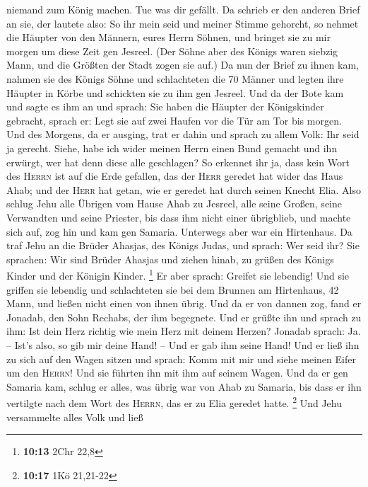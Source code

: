 niemand zum König machen. Tue was dir gefällt.  Da schrieb
er den anderen Brief an sie, der lautete also: So ihr mein seid und
meiner Stimme gehorcht, so nehmet die Häupter von den Männern, eures
Herrn Söhnen, und bringet sie zu mir morgen um diese Zeit gen Jesreel.
(Der Söhne aber des Königs waren siebzig Mann, und die Größten der Stadt
zogen sie auf.)  Da nun der Brief zu ihnen kam, nahmen sie
des Königs Söhne und schlachteten die 70 Männer und legten ihre Häupter
in Körbe und schickten sie zu ihm gen Jesreel.  Und da der
Bote kam und sagte es ihm an und sprach: Sie haben die Häupter der
Königskinder gebracht, sprach er: Legt sie auf zwei Haufen vor die Tür
am Tor bis morgen.  Und des Morgens, da er ausging, trat
er dahin und sprach zu allem Volk: Ihr seid ja gerecht. Siehe, habe ich
wider meinen Herrn einen Bund gemacht und ihn erwürgt, wer hat denn
diese alle geschlagen?  So erkennet ihr ja, dass kein
Wort des \textsc{Herrn} ist auf die Erde gefallen, das der \textsc{Herr}
geredet hat wider das Haus Ahab; und der \textsc{Herr} hat getan, wie er
geredet hat durch seinen Knecht Elia.  Also schlug Jehu
alle Übrigen vom Hause Ahab zu Jesreel, alle seine Großen, seine
Verwandten und seine Priester, bis dass ihm nicht einer übrigblieb,
 und machte sich auf, zog hin und kam gen Samaria.
Unterwegs aber war ein Hirtenhaus.  Da traf Jehu an die
Brüder Ahasjas, des Königs Judas, und sprach: Wer seid ihr? Sie
sprachen: Wir sind Brüder Ahasjas und ziehen hinab, zu grüßen des Königs
Kinder und der Königin Kinder. \footnote{\textbf{10:13} 2Chr 22,8}
 Er aber sprach: Greifet sie lebendig! Und sie griffen
sie lebendig und schlachteten sie bei dem Brunnen am Hirtenhaus, 42
Mann, und ließen nicht einen von ihnen übrig.  Und da er
von dannen zog, fand er Jonadab, den Sohn Rechabs, der ihm begegnete.
Und er grüßte ihn und sprach zu ihm: Ist dein Herz richtig wie mein Herz
mit deinem Herzen? Jonadab sprach: Ja. -- Ist's also, so gib mir deine
Hand! -- Und er gab ihm seine Hand! Und er ließ ihn zu sich auf den
Wagen sitzen  und sprach: Komm mit mir und siehe meinen
Eifer um den \textsc{Herrn}! Und sie führten ihn mit ihm auf seinem
Wagen.  Und da er gen Samaria kam, schlug er alles, was
übrig war von Ahab zu Samaria, bis dass er ihn vertilgte nach dem Wort
des \textsc{Herrn}, das er zu Elia geredet hatte. \footnote{\textbf{10:17}
  1Kö 21,21-22}  Und Jehu versammelte alles Volk und ließ
